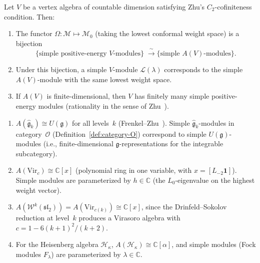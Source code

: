 \begin{theorem}
\label{thm:zhu-correspondence}
Let $V$ be a vertex algebra of countable dimension satisfying Zhu's
$C_2$-cofiniteness condition.  Then:
\begin{enumerate}[label=(\roman*)]
\item The functor $\Omega\colon \mathcal{M} \mapsto \mathcal{M}_0$
   (taking the lowest conformal weight space) is a bijection
   \[
   \{\text{simple positive-energy } V\text{-modules}\}
   \;\xrightarrow{\;\sim\;}
   \{\text{simple } A(V)\text{-modules}\}.
   \]
\item Under this bijection, a simple $V$-module $\mathcal{L}(\lambda)$
   corresponds to the simple $A(V)$-module with the same lowest
   weight space.
\item If $A(V)$ is finite-dimensional, then $V$ has finitely many
   simple positive-energy modules (rationality in the sense
   of Zhu~\cite{Zhu}).
\end{enumerate}
\end{theorem}

\begin{example}\label{ex:zhu-algebras}
\leavevmode
\begin{enumerate}[label=(\roman*)]
\item $A(\widehat{\mathfrak{g}}_k) \cong U(\mathfrak{g})$
   for all levels~$k$
   (Frenkel--Zhu~\cite{FZ92}).  Simple
   $\widehat{\mathfrak{g}}_k$\nobreakdash-modules
   in category~$\mathcal{O}$
   (Definition~\ref{def:category-O}) correspond to
   simple $U(\mathfrak{g})$-modules (i.e.,
   finite-dimensional $\mathfrak{g}$-representations for
   the integrable subcategory).
\item $A(\mathrm{Vir}_c) \cong \mathbb{C}[x]$ \cite{FZ92} (polynomial ring in one
   variable, with $x = [L_{-2}\mathbf{1}]$).  Simple modules are
   parameterized by $h \in \mathbb{C}$ (the $L_0$-eigenvalue on the
   highest weight vector).
\item $A(\mathcal{W}^k(\mathfrak{sl}_2)) = A(\mathrm{Vir}_{c(k)}) \cong
   \mathbb{C}[x]$, since the Drinfeld--Sokolov reduction at level~$k$
   produces a Virasoro algebra with $c = 1 - 6(k+1)^2/(k+2)$.
\item For the Heisenberg algebra $\mathcal{H}_\kappa$,
   $A(\mathcal{H}_\kappa) \cong \mathbb{C}[\alpha]$, and simple
   modules (Fock modules $F_\lambda$) are parameterized by
   $\lambda \in \mathbb{C}$.
\end{enumerate}
\end{example}

